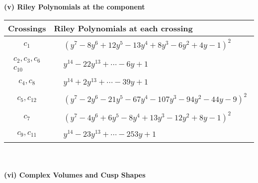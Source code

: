 \documentclass[1p]{elsarticle_modified}
\theoremstyle{definition}
\begin{document}
\newpage\renewcommand{\arraystretch}{1}
\flushleft \textbf{(v) Riley Polynomials at the component}\newline \\
\begin{tabular}{m{50pt}|m{274pt}}
Crossings & \hspace{64pt}Riley Polynomials at each crossing \\
\hline $$\begin{aligned}c_{1}\end{aligned}$$&$\begin{aligned}
&(y^7-8 y^6+12 y^5-13 y^4+8 y^3-6 y^2+4 y-1)^2
\end{aligned}$\\
\hline $$\begin{aligned}c_{2},c_{3},c_{6}\\c_{10}\end{aligned}$$&$\begin{aligned}
&y^{14}-22 y^{13}+\cdots-6 y+1
\end{aligned}$\\
\hline $$\begin{aligned}c_{4},c_{8}\end{aligned}$$&$\begin{aligned}
&y^{14}+2 y^{13}+\cdots-39 y+1
\end{aligned}$\\
\hline $$\begin{aligned}c_{5},c_{12}\end{aligned}$$&$\begin{aligned}
&(y^7-2 y^6-21 y^5-67 y^4-107 y^3-94 y^2-44 y-9)^2
\end{aligned}$\\
\hline $$\begin{aligned}c_{7}\end{aligned}$$&$\begin{aligned}
&(y^7-4 y^6+6 y^5-8 y^4+13 y^3-12 y^2+8 y-1)^2
\end{aligned}$\\
\hline $$\begin{aligned}c_{9},c_{11}\end{aligned}$$&$\begin{aligned}
&y^{14}-23 y^{13}+\cdots-253 y+1
\end{aligned}$\\
\hline
\end{tabular}\\~\\
\newpage\flushleft \textbf{(vi) Complex Volumes and Cusp Shapes}
\end{document}
